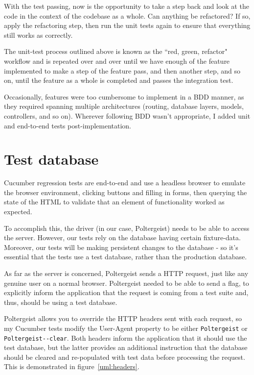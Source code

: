 With the test passing, now is the opportunity to take a step back and look at the code in the context of the codebase as a whole. Can anything be refactored? If so, apply the refactoring step, then run the unit tests again to ensure that everything still works as correctly.

The unit-test process outlined above is known as the ``red, green, refactor" workflow and is repeated over and over until we have enough of the feature implemented to make a step of the feature pass, and then another step, and so on, until the feature as a whole is completed and passes the integration test.

Occasionally, features were too cumbersome to implement in a BDD manner, as they required spanning multiple architectures (routing, database layers, models, controllers, and so on). Wherever following BDD wasn't appropriate, I added unit and end-to-end tests post-implementation.

\section{Test database}

Cucumber regression tests are end-to-end and use a headless browser to emulate the browser environment, clicking buttons and filling in forms, then querying the state of the HTML to validate that an element of functionality worked as expected.

To accomplish this, the driver (in our case, Poltergeist) needs to be able to access the server. However, our tests rely on the database having certain fixture-data. Moreover, our tests will be making persistent changes to the database - so it's essential that the tests use a test database, rather than the production database.

As far as the server is concerned, Poltergeist sends a HTTP request, just like any genuine user on a normal browser. Poltergeist needed to be able to send a flag, to explicitly inform the application that the request is coming from a test suite and, thus, should be using a test database.

Poltergeist allows you to override the HTTP headers sent with each request, so my Cucumber tests modify the User-Agent property to be either \lstinline{Poltergeist} or \lstinline{Poltergeist--clear}. Both headers inform the application that it should use the test database, but the latter provides an additional instruction that the database should be cleared and re-populated with test data before processing the request. This is demonstrated in figure~\ref{uml:headers}.

